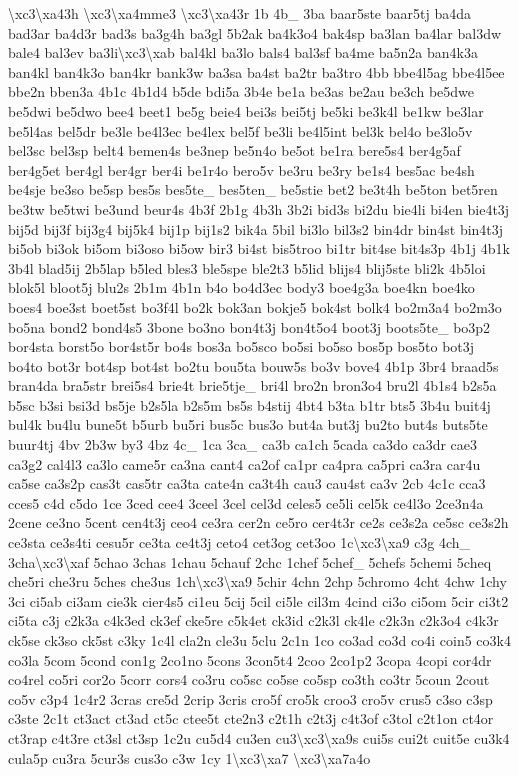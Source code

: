 {\textbackslash{}xc3\textbackslash{}xa43h \textbackslash{}xc3\textbackslash{}xa4mme3 \textbackslash{}xc3\textbackslash{}xa43r 1b 4b\-\_\- 3ba baar5ste baar5tj ba4da bad3ar ba4d3r bad3s ba3g4h ba3gl 5b2ak ba4k3o4 bak4sp ba3lan ba4lar bal3dw bale4 bal3ev ba3li\textbackslash{}xc3\textbackslash{}xab bal4kl ba3lo bals4 bal3sf ba4me ba5n2a ban4k3a ban4kl ban4k3o ban4kr bank3w ba3sa ba4st ba2tr ba3tro 4bb bbe4l5ag bbe4l5ee bbe2n bben3a 4b1c 4b1d4 b5de bdi5a 3b4e be1a be3as be2au be3ch be5dwe be5dwi be5dwo bee4 beet1 be5g beie4 bei3s bei5tj be5ki be3k4l be1kw be3lar be5l4as bel5dr be3le be4l3ec be4lex bel5f be3li be4l5int bel3k bel4o be3lo5v bel3sc bel3sp belt4 bemen4s be3nep be5n4o be5ot be1ra bere5s4 ber4g5af ber4g5et ber4gl ber4gr ber4i be1r4o bero5v be3ru be3ry be1s4 bes5ac be4sh be4sje be3so be5sp bes5s bes5te\-\_\- bes5ten\-\_\- be5stie bet2 be3t4h be5ton bet5ren be3tw be5twi be3und beur4s 4b3f 2b1g 4b3h 3b2i bid3s bi2du bie4li bi4en bie4t3j bij5d bij3f bij3g4 bij5k4 bij1p bij1s2 bik4a 5bil bi3lo bil3s2 bin4dr bin4st bin4t3j bi5ob bi3ok bi5om bi3oso bi5ow bir3 bi4st bis5troo bi1tr bit4se bit4s3p 4b1j 4b1k 3b4l blad5ij 2b5lap b5led bles3 ble5spe ble2t3 b5lid blijs4 blij5ste bli2k 4b5loi blok5l bloot5j blu2s 2b1m 4b1n b4o bo4d3ec body3 boe4g3a boe4kn boe4ko boes4 boe3st boet5st bo3f4l bo2k bok3an bokje5 bok4st bolk4 bo2m3a4 bo2m3o bo5na bond2 bond4s5 3bone bo3no bon4t3j bon4t5o4 boot3j boots5te\-\_\- bo3p2 bor4sta borst5o bor4st5r bo4s bos3a bo5sco bo5si bo5so bos5p bos5to bot3j bo4to bot3r bot4sp bot4st bo2tu bou5ta bouw5s bo3v bove4 4b1p 3br4 braad5s bran4da bra5str brei5s4 brie4t brie5tje\-\_\- bri4l bro2n bron3o4 bru2l 4b1s4 b2s5a b5sc b3si bsi3d bs5je b2s5la b2s5m bs5s b4stij 4bt4 b3ta b1tr bts5 3b4u buit4j bul4k bu4lu bune5t b5urb bu5ri bus5c bus3o but4a but3j bu2to but4s buts5te buur4tj 4bv 2b3w by3 4bz 4c\-\_\- 1ca 3ca\-\_\- ca3b ca1ch 5cada ca3do ca3dr cae3 ca3g2 cal4l3 ca3lo came5r ca3na cant4 ca2of ca1pr ca4pra ca5pri ca3ra car4u ca5se ca3s2p cas3t cas5tr ca3ta cate4n ca3t4h cau3 cau4st ca3v 2cb 4c1c cca3 cces5 c4d c5do 1ce 3ced cee4 3ceel 3cel cel3d celes5 ce5li cel5k ce4l3o 2ce3n4a 2cene ce3no 5cent cen4t3j ceo4 ce3ra cer2n ce5ro cer4t3r ce2s ce3s2a ce5sc ce3s2h ce3sta ce3s4ti cesu5r ce3ta ce4t3j ceto4 cet3og cet3oo 1c\textbackslash{}xc3\textbackslash{}xa9 c3g 4ch\-\_\- 3cha\textbackslash{}xc3\textbackslash{}xaf 5chao 3chas 1chau 5chauf 2chc 1chef 5chef\-\_\- 5chefs 5chemi 5cheq che5ri che3ru 5ches che3us 1ch\textbackslash{}xc3\textbackslash{}xa9 5chir 4chn 2chp 5chromo 4cht 4chw 1chy 3ci ci5ab ci3am cie3k cier4s5 ci1eu 5cij 5cil ci5le cil3m 4cind ci3o ci5om 5cir ci3t2 ci5ta c3j c2k3a c4k3ed ck3ef cke5re c5k4et ck3id c2k3l ck4le c2k3n c2k3o4 c4k3r ck5se ck3so ck5st c3ky 1c4l cla2n cle3u 5clu 2c1n 1co co3ad co3d co4i coin5 co3k4 co3la 5com 5cond con1g 2co1no 5cons 3con5t4 2coo 2co1p2 3copa 4copi cor4dr co4rel co5ri cor2o 5corr cors4 co3ru co5sc co5se co5sp co3th co3tr 5coun 2cout co5v c3p4 1c4r2 3cras cre5d 2crip 3cris cro5f cro5k croo3 cro5v crus5 c3so c3sp c3ste 2c1t ct3act ct3ad ct5c ctee5t cte2n3 c2t1h c2t3j c4t3of c3tol c2t1on ct4or ct3rap c4t3re ct3sl ct3sp 1c2u cu5d4 cu3en cu3\textbackslash{}xc3\textbackslash{}xa9s cui5s cui2t cuit5e cu3k4 cula5p cu3ra 5cur3s cus3o c3w 1cy 1\textbackslash{}xc3\textbackslash{}xa7 \textbackslash{}xc3\textbackslash{}xa7a4o }
